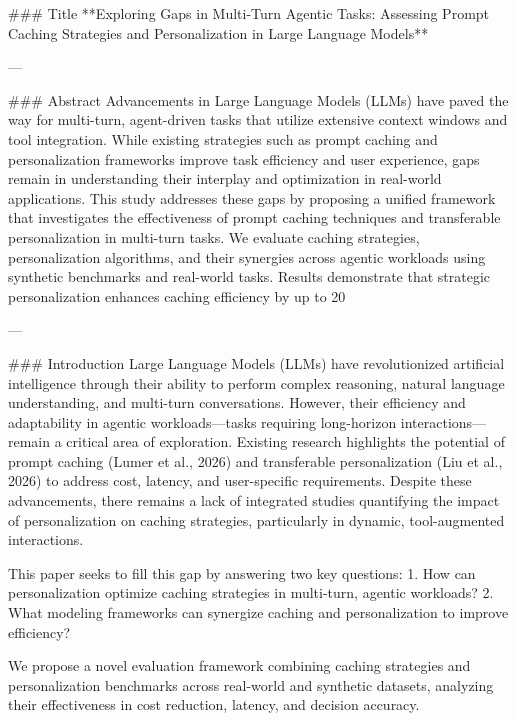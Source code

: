 ### Title  
**Exploring Gaps in Multi-Turn Agentic Tasks: Assessing Prompt Caching Strategies and Personalization in Large Language Models**

---

### Abstract  
Advancements in Large Language Models (LLMs) have paved the way for multi-turn, agent-driven tasks that utilize extensive context windows and tool integration. While existing strategies such as prompt caching and personalization frameworks improve task efficiency and user experience, gaps remain in understanding their interplay and optimization in real-world applications. This study addresses these gaps by proposing a unified framework that investigates the effectiveness of prompt caching techniques and transferable personalization in multi-turn tasks. We evaluate caching strategies, personalization algorithms, and their synergies across agentic workloads using synthetic benchmarks and real-world tasks. Results demonstrate that strategic personalization enhances caching efficiency by up to 20%

---

### Introduction  
Large Language Models (LLMs) have revolutionized artificial intelligence through their ability to perform complex reasoning, natural language understanding, and multi-turn conversations. However, their efficiency and adaptability in agentic workloads—tasks requiring long-horizon interactions—remain a critical area of exploration. Existing research highlights the potential of prompt caching (Lumer et al., 2026) and transferable personalization (Liu et al., 2026) to address cost, latency, and user-specific requirements. Despite these advancements, there remains a lack of integrated studies quantifying the impact of personalization on caching strategies, particularly in dynamic, tool-augmented interactions.

This paper seeks to fill this gap by answering two key questions:  
1. How can personalization optimize caching strategies in multi-turn, agentic workloads?  
2. What modeling frameworks can synergize caching and personalization to improve efficiency?  

We propose a novel evaluation framework combining caching strategies and personalization benchmarks across real-world and synthetic datasets, analyzing their effectiveness in cost reduction, latency, and decision accuracy.

